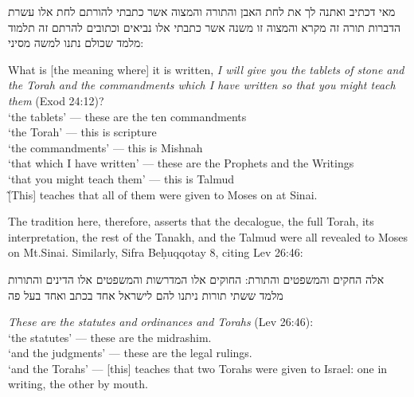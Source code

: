 \begin{aramaictext}
    מאי דכתיב ואתנה לך את לחת האבן והתורה והמצוה אשר כתבתי להורתם לחת אלו עשרת הדברות תורה זה מקרא והמצוה זו משנה אשר כתבתי אלו נביאים וכתובים להרתם זה תלמוד מלמד שכולם נתנו למשה מסיני: 
\end{aramaictext}

\begin{translation}
    What is [the meaning where] it is written, \emph{I will give you the tablets of stone and the Torah and the commandments which I have written so that you might teach them} (Exod 24:12)?\\
    \-\hspace{2em}`the tablets' --- these are the ten commandments\\
    \-\hspace{2em}`the Torah' --- this is scripture\\
    \-\hspace{2em}`the commandments' --- this is Mishnah\\
    \-\hspace{2em}`that which I have written' --- these are the Prophets and the Writings\\
    \-\hspace{2em}`that you might teach them' --- this is Talmud\\\~
    [This] teaches that all of them were given to Moses on at Sinai.
\end{translation}

\noindent
The tradition here, therefore, asserts that the decalogue, the full Torah, its interpretation, the rest of the Tanakh, and the Talmud were all revealed to Moses on Mt.Sinai. Similarly, Sifra Beḥuqqotay 8, citing Lev 26:46:
\begin{aramaictext}
    אלה החקים והמשפטים והתורת: החוקים אלו המדרשות והמשפטים אלו הדינים והתורות מלמד ששתי תורות ניתנו להם לישראל אחד בכתב ואחד בעל פה
\end{aramaictext}
\begin{translation}
    \emph{These are the statutes and ordinances and Torahs} (Lev 26:46):\\
    \-\hspace{2em} `the statutes' --- these are the midrashim.\\
    \-\hspace{2em} `and the judgments' --- these are the legal rulings.\\
    \-\hspace{2em} `and the Torahs' --- [this] teaches that two Torahs were given to Israel: one in writing, the other by mouth.
\end{translation}

